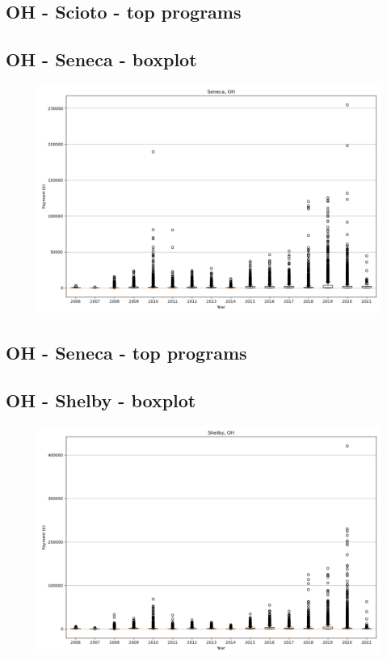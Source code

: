 \subsection*{OH - Scioto - top programs}

\newpage
\subsection*{OH - Seneca - boxplot}
\begin{figure}[h]
\centering
\includegraphics[width=7in]{../output/boxplots/counties/Seneca-OH_boxplot.png}
\end{figure}


\subsection*{OH - Seneca - top programs}

\newpage
\subsection*{OH - Shelby - boxplot}
\begin{figure}[h]
\centering
\includegraphics[width=7in]{../output/boxplots/counties/Shelby-OH_boxplot.png}
\end{figure}


